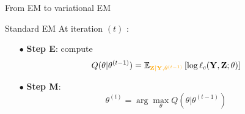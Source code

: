 \documentclass[compress,10pt]{beamer}
\begin{document}
 \begin{frame}{From EM to variational EM}

 
\begin{block}{Standard EM}
At iteration $(t)$ : 
\begin{itemize}
 \item[$\bullet$]\textbf{Step E}: compute 
 $$ Q(\theta | \theta^{(t-1)}) =   \mathbb E_{\color{dgreen}\bZ | \bX, \theta^{(t-1)} } \left[\log \ell_c(\bY,\bZ; \theta)  \right] $$
 \item[$\bullet$]\textbf{Step M}: 
 $$ \theta^{(t)} = \arg \max_{\theta} Q(\theta | \theta^{(t-1)})$$
 \end{itemize}
% 
%
% 
\end{block}
 
 \end{frame}
\end{document}
